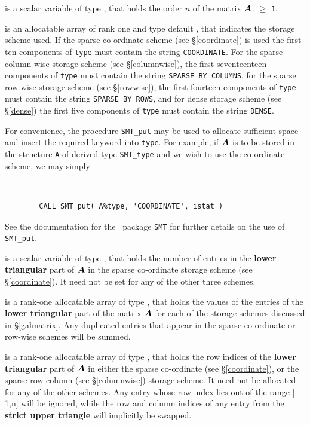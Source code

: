 \documentclass{galahad}
\begin{document}
\begin{description}

 is a scalar variable of type \integer, that holds
the order $n$ of the matrix  ${\bm{A}}$.
 $\geq$ {\tt 1}.

 is an allocatable array of rank one and type default \character,
that indicates the storage scheme used. If the
sparse co-ordinate scheme (see \S\ref{coordinate}) is used
the first ten components of {\tt type} must contain the
string {\tt COORDINATE}.
For the sparse column-wise storage scheme (see \S\ref{columnwise}),
the first seventeenteen components of {\tt type} must contain the
string {\tt SPARSE\_BY\_COLUMNS},
for the sparse row-wise storage scheme (see \S\ref{rowwise}),
the first fourteen components of {\tt type} must contain the
string {\tt SPARSE\_BY\_ROWS}, and
for dense storage scheme (see \S\ref{dense})
the first five components of {\tt type} must contain the
string {\tt DENSE}.

For convenience, the procedure {\tt SMT\_put}
may be used to allocate sufficient space and insert the required keyword
into {\tt type}.
For example, if ${\bm{A}}$ is to be stored in the structure {\tt A}
of derived type {\tt SMT\_type} and we wish to use
the co-ordinate scheme, we may simply
{\tt
\begin{verbatim}
        CALL SMT_put( A%type, 'COORDINATE', istat )
\end{verbatim}
}
\noindent
See the documentation for the \galahad\ package {\tt SMT}
for further details on the use of {\tt SMT\_put}.

 is a scalar variable of type \integer, that
holds the number of entries in the {\bf lower triangular} part of ${\bm{A}}$
in the sparse co-ordinate storage scheme (see \S\ref{coordinate}).
It need not be set for any of the other three schemes.

 is a rank-one allocatable array of type \realdp, that holds
the values of the entries of the {\bf lower triangular} part
of the matrix ${\bm{A}}$ for each of the
storage schemes discussed in \S\ref{galmatrix}.
Any duplicated entries that appear in the sparse
co-ordinate or row-wise schemes will be summed.

 is a rank-one allocatable array of type \integer,
that holds the row indices of the {\bf lower triangular} part of
${\bm{A}}$ in either the sparse co-ordinate
(see \S\ref{coordinate}), or the sparse row-column
(see \S\ref{columnwise}) storage scheme.
It need not be allocated for any of the other schemes.
Any entry whose row index lies out of the range $[$1,n$]$ will be ignored,
while the row and column indices of any entry from the
{\bf strict upper triangle} will implicitly be swapped.


\end{description}
\end{document}
